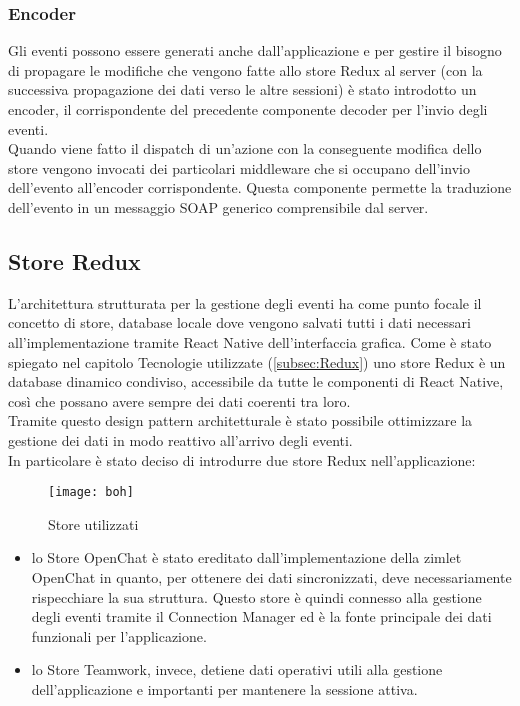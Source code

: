 \subsubsection{Encoder}
Gli eventi possono essere generati anche dall'applicazione e per gestire il bisogno di propagare le modifiche che vengono fatte allo store Redux al server (con la successiva propagazione dei dati verso le altre sessioni) è stato introdotto un encoder, il corrispondente del precedente componente decoder per l'invio degli eventi. \\
Quando viene fatto il dispatch di un'azione con la conseguente modifica dello store vengono invocati dei particolari middleware che si occupano dell'invio dell'evento all'encoder corrispondente. Questa componente permette la traduzione dell'evento in un messaggio SOAP generico comprensibile dal server.

\subsection{Store Redux}
L'architettura strutturata per la gestione degli eventi ha come punto focale il concetto di store, database locale dove vengono salvati tutti i dati necessari all'implementazione tramite React Native dell'interfaccia grafica. Come è stato spiegato nel capitolo Tecnologie utilizzate (\ref{subsec:Redux}) uno store Redux è un database dinamico condiviso, accessibile da tutte le componenti di React Native, così che possano avere sempre dei dati coerenti tra loro. \\
Tramite questo design pattern architetturale è stato possibile ottimizzare la gestione dei dati in modo reattivo all'arrivo degli eventi. \\
In particolare è stato deciso di introdurre due store Redux nell'applicazione:
\begin{figure}[H] 
	\centering
	\texttt{[image: boh]}
	\caption{Store utilizzati}
\end{figure}
\begin{itemize}
	\item lo Store OpenChat è stato ereditato dall'implementazione della zimlet OpenChat in quanto, per ottenere dei dati sincronizzati, deve necessariamente rispecchiare la sua struttura. Questo store è quindi connesso alla gestione degli eventi tramite il Connection Manager ed è la fonte principale dei dati funzionali per l'applicazione.
	\item lo Store Teamwork, invece, detiene dati operativi utili alla gestione dell'applicazione e importanti per mantenere la sessione attiva.
\end{itemize} 

